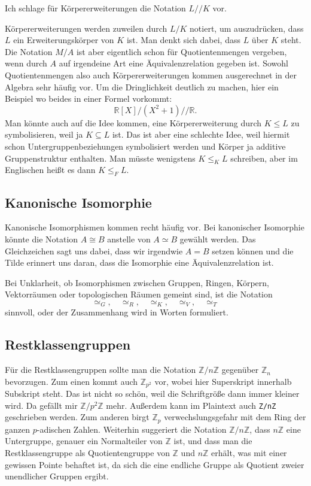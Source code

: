 \documentclass[a4paper,11pt,fleqn]{article}
\newcommand{\Z}{\mathbb Z}
\begin{document}
Ich schlage für Körpererweiterungen die Notation $L/\!/K$
vor.

Körpererweiterungen werden zuweilen durch $L/K$ notiert, um
auszudrücken, dass $L$ ein Erweiterungskörper von $K$ ist.
Man denkt sich dabei, dass $L$ über $K$ steht. Die Notation
$M/A$ ist aber eigentlich schon für Quotientenmengen vergeben,
wenn durch $A$ auf irgendeine Art eine Äquivalenzrelation
gegeben ist. Sowohl Quotientenmengen also auch Körpererweiterungen
kommen ausgerechnet in der Algebra sehr häufig vor.
Um die Dringlichkeit deutlich zu machen, hier ein Beispiel
wo beides in einer Formel vorkommt:
\begin{equation}
\mathbb R[X]/(X^2+1)/\!/\mathbb R.
\end{equation}
Man könnte auch auf die Idee kommen, eine Körpererweiterung
durch $K\le L$ zu symbolisieren, weil ja $K\subseteq L$ ist.
Das ist aber eine schlechte Idee, weil hiermit schon
Untergruppenbeziehungen symbolisiert werden und Körper ja
additive Gruppenstruktur enthalten. Man müsste wenigstens
$K\le_K L$ schreiben, aber im Englischen heißt es dann $K\le_F L$.

\subsection{Kanonische Isomorphie}
Kanonische Isomorphismen kommen recht häufig vor.
Bei kanonischer Isomorphie könnte die Notation $A\cong B$
anstelle von $A\simeq B$ gewählt werden. Das Gleichzeichen sagt
uns dabei, dass wir irgendwie $A=B$ setzen können und die Tilde
erinnert uns daran, dass die Isomorphie eine Äquivalenzrelation
ist.

Bei Unklarheit, ob Isomorphismen zwischen Gruppen, Ringen, Körpern,
Vektorräumen oder topologischen Räumen gemeint sind, ist die
Notation
\begin{equation}
\simeq_G,\quad\simeq_R,\quad\simeq_K,\quad\simeq_V,\quad\simeq_T
\end{equation}
sinnvoll, oder der Zusammenhang wird in Worten formuliert.

\subsection{Restklassengruppen}
Für die Restklassengruppen sollte man die Notation $\Z/n\Z$
gegenüber $\Z_n$ bevorzugen. Zum einen kommt auch $\Z_{p^2}$
vor, wobei hier Superskript innerhalb Subskript steht.
Das ist nicht so schön, weil die Schriftgröße dann immer kleiner
wird. Da gefällt mir $\Z/p^2\Z$ mehr. Außerdem kann im Plaintext
auch \verb|Z/nZ| geschrieben werden. Zum anderen birgt $\Z_p$
verwechslungsgefahr mit dem Ring der ganzen $p$-adischen Zahlen.
Weiterhin suggeriert die
Notation $\Z/n\Z$, dass $n\Z$ eine Untergruppe, genauer ein
Normalteiler von $\Z$ ist, und dass man die Restklassengruppe
als Quotientengruppe von $\Z$ und $n\Z$ erhält, was mit einer
gewissen Pointe behaftet ist, da sich die eine endliche Gruppe
als Quotient zweier unendlicher Gruppen ergibt.
\end{document}
